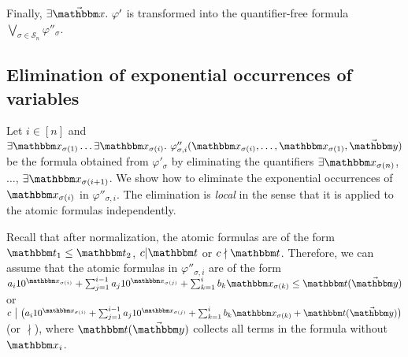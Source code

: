 Finally, $\exists \vec{\ivarx}.\ \varphi'$ is transformed into the quantifier-free formula $\bigvee \limits_{\sigma \in \mathcal{S}_n} \varphi''_{\sigma}$. 



\subsection{Elimination of exponential occurrences of variables}\label{qe-elim-exp}

Let $i \in [n]$ and $\exists \ivarx_{\sigma(1)} \ldots \exists \ivarx_{\sigma(i)}.\ \varphi''_{\sigma,i}(\ivarx_{\sigma(i)}, \ldots, \ivarx_{\sigma(1)}, \vec{\ivary})$ be the formula obtained from $\varphi'_\sigma$ by eliminating the quantifiers $\exists \ivarx_{\sigma(n)}$, $\ldots$, $\exists \ivarx_{\sigma(i+1)}$. We show how to eliminate the exponential occurrences of $\ivarx_{\sigma(i)}$ in $\varphi''_{\sigma,i}$. The elimination is \emph{local} in the sense that it is applied to the atomic formulas independently. 

Recall that after normalization, the atomic formulas are of the form $\iterm_1 \le \iterm_2$, $c \vert  \iterm$ or $c \nmid \iterm$. Therefore, we can assume that the atomic formulas in $\varphi''_{\sigma,i}$ are  of the form 
%
$a_i 10^{\ivarx_{\sigma(i)}}+\sum_{j=1}^{i-1} a_j 10^{\ivarx_{\sigma(j)}} + \sum_{k=1}^{i}b_k \ivarx_{\sigma(k)} \le \iterm(\vec{\ivary})$
or  
$c \ \big  \vert  \ \big(a_i 10^{\ivarx_{\sigma(i)}}+\sum_{j=1}^{i-1} a_j 10^{\ivarx_{\sigma(j)}} + \sum_{k=1}^{i}b_k \ivarx_{\sigma(k)} + \iterm(\vec{\ivary})\big)$
(or $\nmid$), where $\iterm(\vec{\ivary})$ collects all terms in the formula without $\ivarx_i$.

